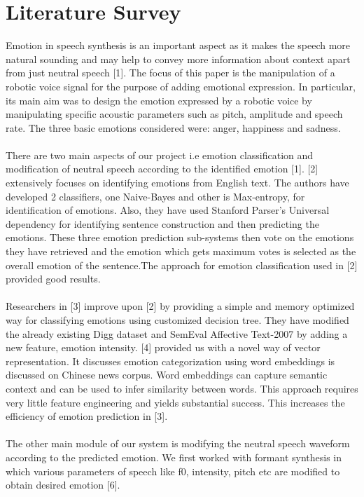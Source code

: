 \documentclass[oneside,a4paper,12pt]{book}
\begin{document}
\section{Literature Survey}

	Emotion in speech synthesis is an important aspect as it makes the speech more natural sounding and may
	help to convey more information about context apart from just neutral speech [1].
	The focus of this paper is the manipulation of a robotic voice signal for the purpose of adding emotional
	expression. In particular, its main aim was to design the emotion expressed by a robotic voice by manipulating
	specific acoustic parameters such as pitch, amplitude and speech rate. The three basic emotions considered were:
	anger, happiness and sadness.\\\\
	There are two main aspects of our project i.e emotion classification and modification of neutral speech according to
	the identified emotion [1]. [2] extensively focuses on identifying emotions from English text. The authors have
	developed 2 classifiers, one Naive-Bayes and other is Max-entropy, for identification of emotions. Also, they have
	used Stanford Parser's Universal dependency for identifying sentence construction and then predicting
	the emotions. These three emotion prediction sub-systems then vote on the emotions they have retrieved
	and the emotion which gets maximum votes is selected as the overall emotion of the sentence.The approach for emotion classification used in [2] provided good results.\\\\
	Researchers in [3] improve upon [2] by providing a
	simple and memory optimized way for classifying emotions using customized decision tree.
	They have modified the already existing Digg dataset and SemEval Affective Text-2007 by adding a new feature, emotion intensity. [4] provided us with a novel way of vector representation. It discusses emotion categorization using word embeddings is discussed on Chinese news corpus. Word embeddings can capture semantic context and can be used to infer similarity between words. This
	approach requires very little feature engineering and yields substantial success. This increases the efficiency of emotion prediction
	in [3].\\\\
	The other main module of our system is modifying the neutral speech waveform according to the predicted emotion. We first worked with
	formant synthesis in which various parameters of speech like f0, intensity, pitch etc are modified to obtain desired emotion [6].
\end{document}
